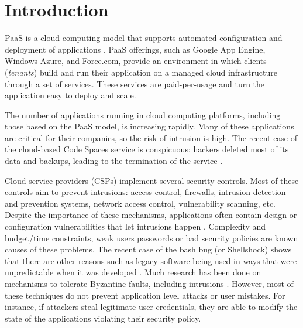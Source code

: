 
\section{Introduction}
\label{sec:introduction}

\acf{PaaS} is a cloud computing model that supports automated configuration and deployment of applications \cite{Vaquero2008,Vaquero2011}. \ac{PaaS} offerings, such as Google App Engine, Windows Azure, and Force.com, provide an environment  in which clients (\textit{tenants}) build and run their application on a managed cloud infrastructure through a set of services. These services are paid-per-usage and turn the application easy to deploy and scale.

The number of applications running in cloud computing platforms, including those based on the \ac{PaaS} model, is increasing rapidly. Many of these applications are critical for their companies, so the risk of intrusion is high. The recent case of the cloud-based Code Spaces service is conspicuous: hackers deleted most of its data and backups, leading to the termination of the service \cite{McAllister:14}.


Cloud service providers (CSPs) implement several security controls. Most of these controls aim to prevent intrusions: access control, firewalls, intrusion detection and prevention systems, network access control, vulnerability scanning, etc. Despite the importance of these mechanisms, applications often contain design or configuration vulnerabilities that let intrusions happen \cite{Williams2013} . Complexity and budget/time constraints, weak users passwords or bad security policies are known causes of these problems. The recent case of the bash bug (or Shellshock) shows that there are other reasons such as legacy software being used in ways that were unpredictable when it was developed \cite{Sidhpurwala:14}.
Much research has been done on mechanisms to tolerate Byzantine faults, including intrusions \cite{Verissimo2003}. However, most of these techniques do not prevent application level attacks or user mistakes. For instance, if attackers steal legitimate user credentials, they are able to modify the state of the applications violating their security policy. 


